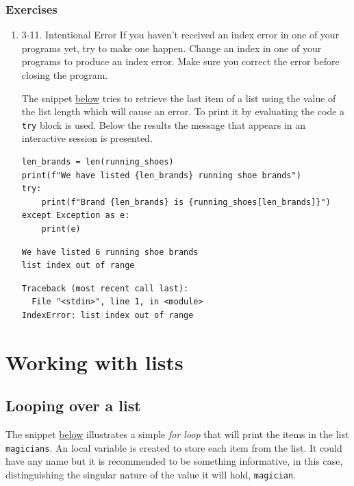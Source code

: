 \documentclass[10pt]{book}
\begin{document}
\subsection{Exercises}
\label{sec:orgf03a65c}
\begin{enumerate}
\item 3-11. Intentional Error
\label{sec:org9c92a55}
If you haven’t received an index error in one of your programs yet, try to make one happen. Change an index in one of your programs to produce an index error. Make sure you correct the error before closing the program.

The snippet \hyperref[org7526e19]{below} tries to retrieve the last item of a list using the value of the list length which will cause an error. To print it by evaluating the code a \texttt{try} block is used. Below the results the message that appears in an interactive session is presented.

\label{org7526e19}
\begin{verbatim}
len_brands = len(running_shoes)
print(f"We have listed {len_brands} running shoe brands")
try:
    print(f"Brand {len_brands} is {running_shoes[len_brands]}")
except Exception as e:
    print(e)

\end{verbatim}

\label{orgf1b4d9e}
\begin{verbatim}
We have listed 6 running shoe brands
list index out of range
\end{verbatim}

\begin{verbatim}
Traceback (most recent call last):
  File "<stdin>", line 1, in <module>
IndexError: list index out of range
\end{verbatim}
\end{enumerate}
\chapter{Working with lists}
\label{sec:org310f288}
\section{Looping over a list}
\label{sec:org283fba2}
The snippet \hyperref[org738967a]{below} illustrates a simple \emph{for loop} that will print the items in the list \texttt{magicians}. An local variable is created to store each item from the list. It could have any name but it is recommended to be something informative, in this case, distinguishing the singular nature of the value it will hold, \texttt{magician}. 
\end{document}
